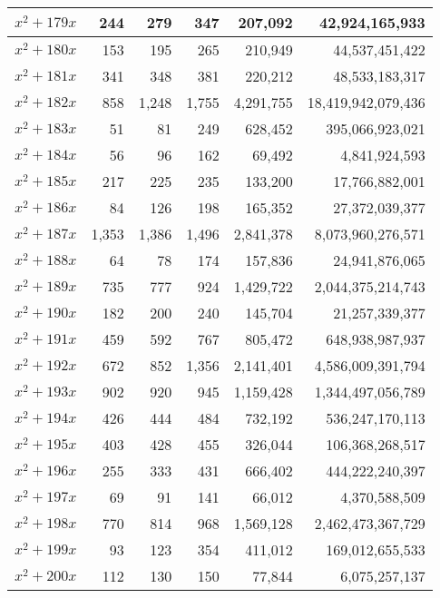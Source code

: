 \documentclass[a4paper]{amsproc}
\theoremstyle{plain}
\begin{document}
\begin{longtable}{ | l | r | r | r | r | r | }
$x^2 + 179x$ & 244 & 279 & 347 & 207{,}092 & 42{,}924{,}165{,}933 \\ \hline
$x^2 + 180x$ & 153 & 195 & 265 & 210{,}949 & 44{,}537{,}451{,}422 \\ \hline
$x^2 + 181x$ & 341 & 348 & 381 & 220{,}212 & 48{,}533{,}183{,}317 \\ \hline
$x^2 + 182x$ & 858 & 1{,}248 & 1{,}755 & 4{,}291{,}755 & 18{,}419{,}942{,}079{,}436 \\ \hline
$x^2 + 183x$ & 51 & 81 & 249 & 628{,}452 & 395{,}066{,}923{,}021 \\ \hline
$x^2 + 184x$ & 56 & 96 & 162 & 69{,}492 & 4{,}841{,}924{,}593 \\ \hline
$x^2 + 185x$ & 217 & 225 & 235 & 133{,}200 & 17{,}766{,}882{,}001 \\ \hline
$x^2 + 186x$ & 84 & 126 & 198 & 165{,}352 & 27{,}372{,}039{,}377 \\ \hline
$x^2 + 187x$ & 1{,}353 & 1{,}386 & 1{,}496 & 2{,}841{,}378 & 8{,}073{,}960{,}276{,}571 \\ \hline
$x^2 + 188x$ & 64 & 78 & 174 & 157{,}836 & 24{,}941{,}876{,}065 \\ \hline
$x^2 + 189x$ & 735 & 777 & 924 & 1{,}429{,}722 & 2{,}044{,}375{,}214{,}743 \\ \hline
$x^2 + 190x$ & 182 & 200 & 240 & 145{,}704 & 21{,}257{,}339{,}377 \\ \hline
$x^2 + 191x$ & 459 & 592 & 767 & 805{,}472 & 648{,}938{,}987{,}937 \\ \hline
$x^2 + 192x$ & 672 & 852 & 1{,}356 & 2{,}141{,}401 & 4{,}586{,}009{,}391{,}794 \\ \hline
$x^2 + 193x$ & 902 & 920 & 945 & 1{,}159{,}428 & 1{,}344{,}497{,}056{,}789 \\ \hline
$x^2 + 194x$ & 426 & 444 & 484 & 732{,}192 & 536{,}247{,}170{,}113 \\ \hline
$x^2 + 195x$ & 403 & 428 & 455 & 326{,}044 & 106{,}368{,}268{,}517 \\ \hline
$x^2 + 196x$ & 255 & 333 & 431 & 666{,}402 & 444{,}222{,}240{,}397 \\ \hline
$x^2 + 197x$ & 69 & 91 & 141 & 66{,}012 & 4{,}370{,}588{,}509 \\ \hline
$x^2 + 198x$ & 770 & 814 & 968 & 1{,}569{,}128 & 2{,}462{,}473{,}367{,}729 \\ \hline
$x^2 + 199x$ & 93 & 123 & 354 & 411{,}012 & 169{,}012{,}655{,}533 \\ \hline
$x^2 + 200x$ & 112 & 130 & 150 & 77{,}844 & 6{,}075{,}257{,}137 \\ \hline

\end{longtable}
\end{document}
